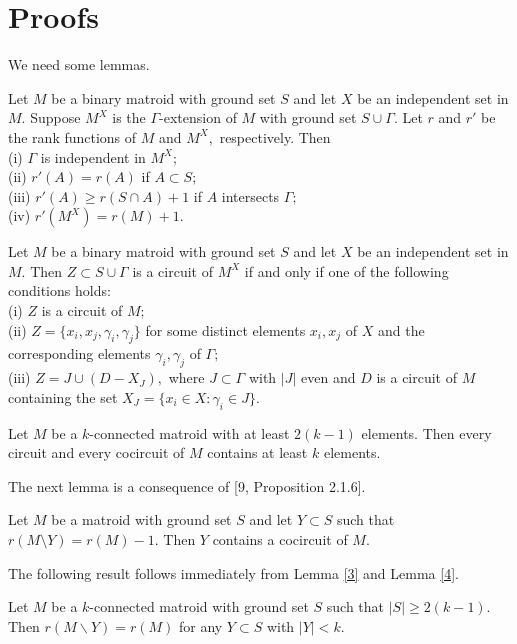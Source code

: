 \documentclass[
11pt,%
tightenlines,%
twoside,%
onecolumn,%
nofloats,%
nobibnotes,%
nofootinbib,%
superscriptaddress,%
noshowpacs,%
centertags]%
{revtex4}
\begin{document}
 \section{Proofs}
 We  need some lemmas.
\begin{lemma}\cite{a1}\label{1}  Let $M$ be a binary matroid with ground set $S$ and let $X$ be an independent set in $M.$ Suppose $M^X$ is  the  $\Gamma$-extension of $M$ with ground set $ S \cup \Gamma.$  Let $r$ and $r'$ be the rank functions of $M$ and $M^{X},$ respectively.  Then\\
   (i) $\Gamma$ is independent in $M^{X};$\\
    (ii) $r'(A) = r(A) $ if $ A \subset S;$ \\
    (iii) $r'(A) \geq r(S\cap A) + 1 $ if  $ A$ intersects $\Gamma;$  \\
    (iv) $r'(M^{X})=r(M)+1.$\\
\end{lemma}

\begin{lemma} \cite{a1} \label{2}
Let $M$ be a binary matroid with ground set $S$ and let $X$ be an independent set in $M.$
Then $ Z \subset S\cup \Gamma$ is a circuit of $M^X$ if and only if one of the following conditions holds:\\
(i) $Z$ is a circuit of $M;$ \\
    (ii) $  Z  = \{x_i,  x_j, \gamma_{i}, \gamma_{j}\}$ for some distinct elements $x_i, x_j$ of $X$
     and the corresponding elements $\gamma_i, \gamma_j$ of $\Gamma;$\\
(iii) $ Z = J \cup (D - X_J),$ where $ J \subset \Gamma$ with $ |J|$ even and $D$ is a circuit of
 $M$ containing the set $ X_J = \{ x_i \in X\colon \gamma_i \in J\}.$
    \end{lemma}
    \begin{lemma}  [\cite{ox}, pp 273] \label{3} Let $M$ be a $k$-connected  matroid with at least
     $2(k-1)$ elements. Then every circuit and every cocircuit of $M$ contains at least $k$ elements.
\end{lemma}
The next lemma is a consequence of [9, Proposition 2.1.6].
\begin{lemma}\cite{b} \label{4} Let $M$ be a matroid with ground set $S$ and let
 $ Y \subset S $ such that $ r(M\setminus Y) = r(M) - 1.$ Then $Y$ contains a cocircuit of $M.$
\end{lemma}
The following result follows immediately from Lemma \ref{3} and  Lemma \ref{4}.
    \begin{corollary}  \label{5}
    Let $M$ be a $k$-connected matroid with ground set $S$ such that $|S| \geq 2(k-1).$
    Then  $r(M \backslash Y) = r(M)$ for any $Y \subset S$ with $|Y|< k.$
    \end{corollary}
\end{document}
